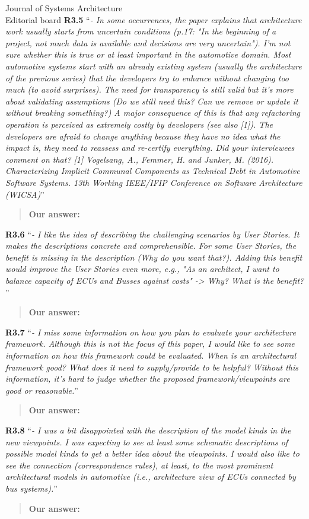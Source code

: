 \documentclass[a4paper,10pt]{letter}
\begin{document}
\begin{letter}{Journal of Systems Architecture\\
    Editorial board}
\textbf{R3.5} ``\textit{- In some occurrences, the paper explains that architecture work usually starts from uncertain conditions (p.17: "In the beginning of a project, not much data is available and decisions are very uncertain"). I'm not sure whether this is true or at least important in the automotive domain. Most automotive systems start with an already existing system (usually the architecture of the previous series) that the developers try to enhance without changing too much (to avoid surprises). The need for transparency is still valid but it's more about validating assumptions (Do we still need this? Can we remove or update it without breaking something?) A major consequence of this is that any refactoring operation is perceived as extremely costly by developers (see also [1]). The developers are afraid to change anything because they have no idea what the impact is, they need to reassess and re-certify everything. Did your interviewees comment on that? 
[1] Vogelsang, A., Femmer, H. and Junker, M. (2016). Characterizing Implicit Communal Components as Technical Debt in Automotive Software Systems. 13th Working IEEE/IFIP Conference on Software Architecture (WICSA)}''
\begin{quote}
\textbf{Our answer: }
\end{quote}

\textbf{R3.6} ``\textit{- I like the idea of describing the challenging scenarios by User Stories. It makes the descriptions concrete and comprehensible. For some User Stories, the benefit is missing in the description (Why do you want that?). Adding this benefit would improve the User Stories even more, e.g., "As an architect, I want to balance capacity of ECUs and Busses against costs" -> Why? What is the benefit? }''
\begin{quote}
\textbf{Our answer: }
\end{quote}

\textbf{R3.7} ``\textit{- I miss some information on how you plan to evaluate your architecture framework. Although this is not the focus of this paper, I would like to see some information on how this framework could be evaluated. When is an architectural framework good? What does it need to supply/provide to be helpful? Without this information, it's hard to judge whether the proposed framework/viewpoints are good or reasonable.}''
\begin{quote}
\textbf{Our answer: }
\end{quote}

\textbf{R3.8} ``\textit{- I was a bit disappointed with the description of the model kinds in the new viewpoints. I was expecting to see at least some schematic descriptions of possible model kinds to get a better idea about the viewpoints. I would also like to see the connection (correspondence rules), at least, to the most prominent architectural models in automotive (i.e., architecture view of ECUs connected by bus systems).}''
\begin{quote}
\textbf{Our answer: }
\end{quote}


\end{letter}
\end{document}
